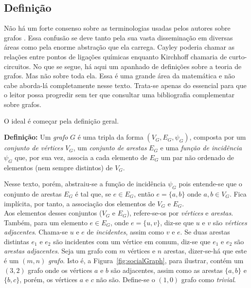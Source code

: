 \documentclass[a4paper,12pt]{article}
\begin{document}
\subsection{Definição}

Não há um forte consenso sobre as terminologias usadas pelos autores sobre grafos \cite{graphTheoryFHarary}. Essa confusão se deve tanto pela sua vasta disseminação em diversas áreas como pela enorme abstração que ela carrega. Cayley poderia chamar as relações entre pontos de ligações químicas enquanto Kirchhoff chamaria de curto-circuitos.
No que se segue, há aqui um apanhado de definições sobre a teoria de grafos. Mas não sobre toda ela. Essa é uma grande área da matemática e não cabe aborda-lá completamente nesse texto. Trata-se apenas do essencial para que o leitor possa progredir sem ter que consultar uma bibliografia complementar sobre grafos.

O ideal é começar pela definição geral.

\begin{center}
	\begin{minipage}{0.9 \linewidth}
		\textbf{Definição:} Um \textit{grafo} $G$ é uma tripla da forma $(V_G,E_G, \psi_{G})$, composta por um \textit{conjunto de vértices} $V_G$, um \textit{conjunto de arestas} $E_G$ e uma \textit{função de incidência} $\psi_{G}$ que, por sua vez, associa a cada elemento de $E_G$ um par não ordenado de elementos (nem sempre distintos) de $V_G$.
	\end{minipage}
\end{center} 

Nesse texto, porém, abstraiu-se a função de incidência $\psi_G$ pois entende-se que o conjunto de arestas $E_G$ é tal que, se $e \in E_G$, então $e = \{a, b\}$ onde $a, b \in V_G$. Fica implícita, por tanto, a associação dos elementos de  $V_G$ e $E_G$.
\\

Aos elementos desses conjuntos ($V_G$ e $E_G$), refere-se-os por \textit{vértices} e \textit{arestas}. Também, para um elemento $e \in E_G$, onde $e = \{u, v\}$, diz-se que $u$ e $v$ são \textit{vértices adjacentes}. Chama-se $u$ e $e$ de \textit{incidentes}, assim como $v$ e $e$. Se duas arestas distintas $e_1$ e $e_2$ são incidentes com um vértice em comum, diz-se que $e_1$ e $e_2$ são \textit{arestas adjacentes}. Seja um grafo com $m$ vértices e $n$ arestas, dizer-se-há que este é um $(m, n)$ \textit{grafo}. Isto é, a Figura~\ref{fig:socialGraph}, para ilustrar, contém um $(3,2)$ grafo onde os vértices $a$ e $b$ são adjacentes, assim como as arestas $\{a, b\}$ e $\{b, c\}$, porém, os vértices $a$ e $c$ não são.
Define-se o $(1,0)$ grafo como \textit{trivial}.
\end{document}
